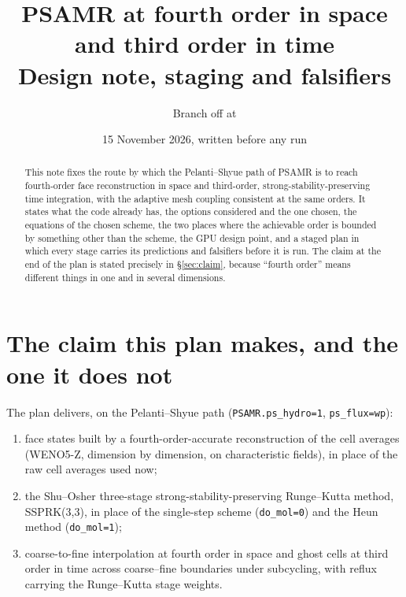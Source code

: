 \documentclass[11pt,a4paper]{article}
\title{PSAMR at fourth order in space and third order in time\\
       \large Design note, staging and falsifiers}
\author{Branch \code{high-order} off \code{main} at \code{e9eecf18}}
\date{15 November 2026, written before any run}
\newcommand{\code}[1]{\texttt{\small #1}}
\begin{document}
\maketitle

\begin{abstract}
\noindent
This note fixes the route by which the Pelanti--Shyue path of PSAMR is to
reach fourth-order face reconstruction in space and third-order,
strong-stability-preserving time integration, with the adaptive mesh
coupling consistent at the same orders.  It states what the code already
has, the options considered and the one chosen, the equations of the chosen
scheme, the two places where the achievable order is bounded by something
other than the scheme, the GPU design point, and a staged plan in which
every stage carries its predictions and falsifiers before it is run.  The
claim at the end of the plan is stated precisely in \S\ref{sec:claim},
because ``fourth order'' means different things in one and in several
dimensions.
\end{abstract}

\tableofcontents

\section{The claim this plan makes, and the one it does not}
\label{sec:claim}

The plan delivers, on the Pelanti--Shyue path (\code{PSAMR.ps\_hydro=1},
\code{ps\_flux=wp}):

\begin{enumerate}[nosep]
\item face states built by a fourth-order-accurate reconstruction of the
      cell averages (WENO5-Z, dimension by dimension, on characteristic
      fields), in place of the raw cell averages used now;
\item the Shu--Osher three-stage strong-stability-preserving Runge--Kutta
      method, SSPRK(3,3), in place of the single-step scheme (\code{do\_mol=0})
      and the Heun method (\code{do\_mol=1});
\item coarse-to-fine interpolation at fourth order in space and
      ghost cells at third order in time across coarse--fine boundaries
      under subcycling, with reflux carrying the Runge--Kutta stage
      weights.
\end{enumerate}
\end{document}
